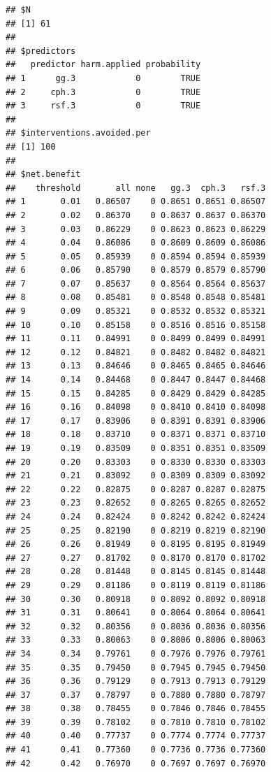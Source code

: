 \documentclass{article}\usepackage[]{graphicx}\usepackage[]{color}
\makeatletter
\newenvironment{kframe}{%
 \def\at@end@of@kframe{}%
 \ifinner\ifhmode%
  \def\at@end@of@kframe{\end{minipage}}%
  \begin{minipage}{\columnwidth}%
 \fi\fi%
 \def\FrameCommand##1{\hskip\@totalleftmargin \hskip-\fboxsep
 \colorbox{shadecolor}{##1}\hskip-\fboxsep
     \hskip-\linewidth \hskip-\@totalleftmargin \hskip\columnwidth}%
 \MakeFramed {\advance\hsize-\width
   \@totalleftmargin\z@ \linewidth\hsize
   \@setminipage}}%
 {\par\unskip\endMakeFramed%
 \at@end@of@kframe}
\newenvironment{knitrout}{}{} %
\makeatother
\begin{document}
\begin{knitrout}
\begin{kframe}\begin{verbatim}
## $N
## [1] 61
## 
## $predictors
##   predictor harm.applied probability
## 1      gg.3            0        TRUE
## 2     cph.3            0        TRUE
## 3     rsf.3            0        TRUE
## 
## $interventions.avoided.per
## [1] 100
## 
## $net.benefit
##    threshold       all none   gg.3  cph.3   rsf.3
## 1       0.01   0.86507    0 0.8651 0.8651 0.86507
## 2       0.02   0.86370    0 0.8637 0.8637 0.86370
## 3       0.03   0.86229    0 0.8623 0.8623 0.86229
## 4       0.04   0.86086    0 0.8609 0.8609 0.86086
## 5       0.05   0.85939    0 0.8594 0.8594 0.85939
## 6       0.06   0.85790    0 0.8579 0.8579 0.85790
## 7       0.07   0.85637    0 0.8564 0.8564 0.85637
## 8       0.08   0.85481    0 0.8548 0.8548 0.85481
## 9       0.09   0.85321    0 0.8532 0.8532 0.85321
## 10      0.10   0.85158    0 0.8516 0.8516 0.85158
## 11      0.11   0.84991    0 0.8499 0.8499 0.84991
## 12      0.12   0.84821    0 0.8482 0.8482 0.84821
## 13      0.13   0.84646    0 0.8465 0.8465 0.84646
## 14      0.14   0.84468    0 0.8447 0.8447 0.84468
## 15      0.15   0.84285    0 0.8429 0.8429 0.84285
## 16      0.16   0.84098    0 0.8410 0.8410 0.84098
## 17      0.17   0.83906    0 0.8391 0.8391 0.83906
## 18      0.18   0.83710    0 0.8371 0.8371 0.83710
## 19      0.19   0.83509    0 0.8351 0.8351 0.83509
## 20      0.20   0.83303    0 0.8330 0.8330 0.83303
## 21      0.21   0.83092    0 0.8309 0.8309 0.83092
## 22      0.22   0.82875    0 0.8287 0.8287 0.82875
## 23      0.23   0.82652    0 0.8265 0.8265 0.82652
## 24      0.24   0.82424    0 0.8242 0.8242 0.82424
## 25      0.25   0.82190    0 0.8219 0.8219 0.82190
## 26      0.26   0.81949    0 0.8195 0.8195 0.81949
## 27      0.27   0.81702    0 0.8170 0.8170 0.81702
## 28      0.28   0.81448    0 0.8145 0.8145 0.81448
## 29      0.29   0.81186    0 0.8119 0.8119 0.81186
## 30      0.30   0.80918    0 0.8092 0.8092 0.80918
## 31      0.31   0.80641    0 0.8064 0.8064 0.80641
## 32      0.32   0.80356    0 0.8036 0.8036 0.80356
## 33      0.33   0.80063    0 0.8006 0.8006 0.80063
## 34      0.34   0.79761    0 0.7976 0.7976 0.79761
## 35      0.35   0.79450    0 0.7945 0.7945 0.79450
## 36      0.36   0.79129    0 0.7913 0.7913 0.79129
## 37      0.37   0.78797    0 0.7880 0.7880 0.78797
## 38      0.38   0.78455    0 0.7846 0.7846 0.78455
## 39      0.39   0.78102    0 0.7810 0.7810 0.78102
## 40      0.40   0.77737    0 0.7774 0.7774 0.77737
## 41      0.41   0.77360    0 0.7736 0.7736 0.77360
## 42      0.42   0.76970    0 0.7697 0.7697 0.76970

\end{verbatim}
\end{kframe}
\end{knitrout}
\end{document}
